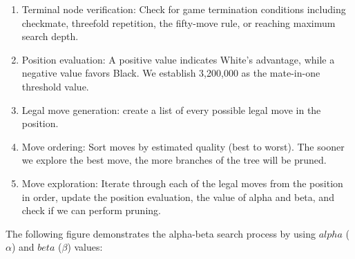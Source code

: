 \begin{enumerate}
    \item Terminal node verification: Check for game termination conditions including checkmate, threefold repetition, the fifty-move rule, or reaching maximum search depth.
    \item Position evaluation: A positive value indicates White's advantage, while a negative value favors Black. We establish 3,200,000 as the mate-in-one threshold value.
    \item Legal move generation: create a list of every possible legal move in the position.
    \item Move ordering: Sort moves by estimated quality (best to worst). The sooner we explore the best move, the more branches of the tree will be pruned.
    \item Move exploration: Iterate through each of the legal moves from the position in order, update the position evaluation, the value of alpha and beta, and check if we can perform pruning.
\end{enumerate}

\noindent The following figure demonstrates the alpha-beta search process by using $alpha$ ($\alpha$) and $beta$ ($\beta$) values:

\newpage

